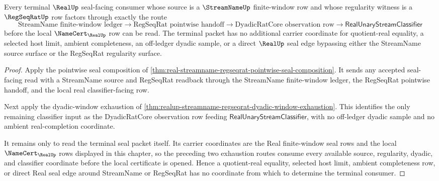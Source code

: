 \begin{theorem}
\label{thm:real-streamname-regseqrat-terminal-seal-exhaustion}
Every terminal $\RealUp$ seal-facing consumer whose source is a
$\StreamNameUp$ finite-window row and whose regularity witness is a
$\RegSeqRatUp$ row factors through exactly the route
$$
\text{StreamName finite-window ledger}
\to
\text{RegSeqRat pointwise handoff}
\to
\text{DyadicRatCore observation row}
\to
\mathsf{RealUnaryStreamClassifier}
$$
before the local $\NameCert_{\RealUp}$ row can be read. The terminal packet
has no additional carrier coordinate for quotient-real equality, a selected
host limit, ambient completeness, an off-ledger dyadic sample, or a direct
$\RealUp$ seal edge bypassing either the StreamName source surface or the
RegSeqRat regularity surface.
\end{theorem}
\begin{proof}
Apply the pointwise seal composition of
\autoref{thm:real-streamname-regseqrat-pointwise-seal-composition}. It sends
any accepted seal-facing read with a StreamName source and RegSeqRat readback
through the StreamName finite-window ledger, the RegSeqRat pointwise handoff,
and the local real classifier-facing row.

Next apply the dyadic-window exhaustion of
\autoref{thm:realup-streamname-regseqrat-dyadic-window-exhaustion}. This
identifies the only remaining classifier input as the DyadicRatCore
observation row feeding $\mathsf{RealUnaryStreamClassifier}$, with no
off-ledger dyadic sample and no ambient real-completion coordinate.

It remains only to read the terminal seal packet itself. Its carrier
coordinates are the Real finite-window seal rows and the local
$\NameCert_{\RealUp}$ rows displayed in this chapter, so the preceding two
exhaustion routes consume every available source, regularity, dyadic, and
classifier coordinate before the local certificate is opened. Hence a
quotient-real equality, selected host limit, ambient completeness row, or
direct Real seal edge around StreamName or RegSeqRat has no coordinate from
which to determine the terminal consumer.
\end{proof}

